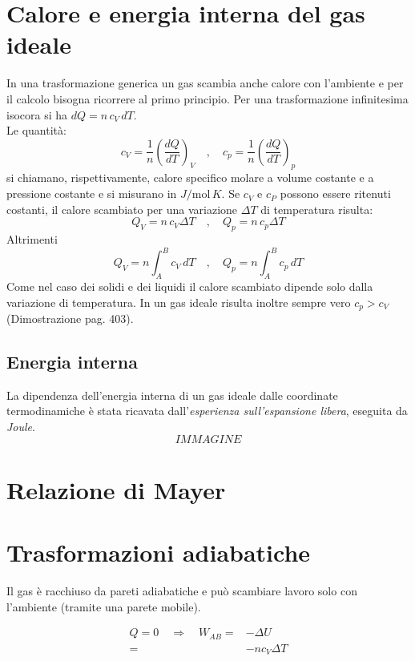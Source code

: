 \documentclass[x11names]{report}
\begin{document}
	\section{Calore e energia interna del gas ideale}
	In una trasformazione generica un gas scambia anche calore con l'ambiente e per il calcolo bisogna ricorrere al primo principio. Per una trasformazione infinitesima isocora si ha $dQ = n\,c_V\,dT$. \\Le quantità:
	\[ 
	c_V = \frac{1}{n}\left(\frac{dQ}{dT}\right)_V \quad,\quad c_p = \frac{1}{n}\left(\frac{dQ}{dT}\right)_p
	\]
	si chiamano, rispettivamente, calore specifico molare a volume costante e a pressione costante e si misurano in $J/\text{mol}\,K$. 
	Se $c_V$ e $c_P$ possono essere ritenuti costanti, il calore scambiato per una variazione $\Delta T$ di temperatura risulta: 
	\begin{equation} 
		Q_V = n\,c_V\Delta T \quad,\quad Q_p = n\,c_p\Delta T
	\end{equation}
	Altrimenti
	\begin{equation} 
		Q_V = n\int_{A}^{B} c_V\,dT \quad,\quad Q_p = n\int_{A}^{B} c_p\,dT
	\end{equation}
	Come nel caso dei solidi e dei liquidi il calore scambiato dipende solo dalla variazione di temperatura. In un gas ideale risulta inoltre sempre vero $c_p > c_V$ (Dimostrazione pag. 403). 
	
	\subsection{Energia interna}
	La dipendenza dell'energia interna di un gas ideale dalle coordinate termodinamiche è stata ricavata dall'\textit{esperienza sull'espansione libera}, eseguita da \textit{Joule}.
	\[ IMMAGINE \]
	
	
	
	\section{Relazione di Mayer}
	
	\section{Trasformazioni adiabatiche}
	Il gas è racchiuso da pareti adiabatiche e può scambiare lavoro solo con l'ambiente (tramite una parete mobile).
	
	\begin{align*}
		Q = 0 \quad \Rightarrow \quad W_{AB} =& -\Delta U \\
		=& -nc_{V} \Delta T
	\end{align*}
	
\end{document}
